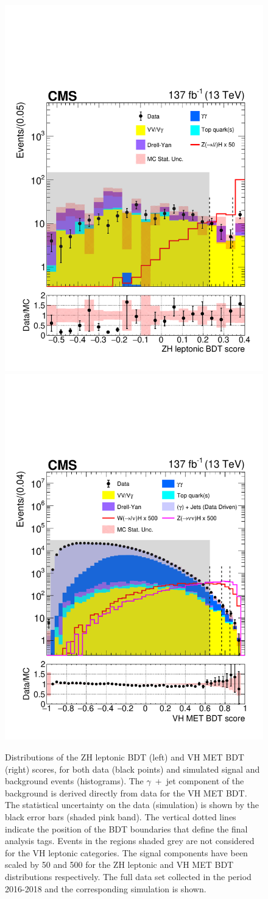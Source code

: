 \begin{figure}[htb]
  \centering
  \includegraphics[width=.49\textwidth]{Figures/hgg_overview/ZHMVA.pdf}
  \hfill
  \includegraphics[width=.49\textwidth]{Figures/hgg_overview/VHMETMVA.pdf}
  \caption[Output scores of two discriminants used for the VH leptonic production mode categories]
  {
    Distributions of the ZH leptonic BDT (left) and VH MET BDT (right) scores, for both data (black points) and simulated signal and background events (histograms). The $\gamma$~+~jet component of the background is derived directly from data for the VH MET BDT. The statistical uncertainty on the data (simulation) is shown by the black error bars (shaded pink band). The vertical dotted lines indicate the position of the BDT boundaries that define the final analysis tags. Events in the regions shaded grey are not considered for the VH leptonic categories. The signal components have been scaled by 50 and 500 for the ZH leptonic and VH MET BDT distributions respectively. The full data set collected in the period 2016-2018 and the corresponding simulation is shown.
  }
  \label{fig:categorisation_vhlep}
\end{figure}

